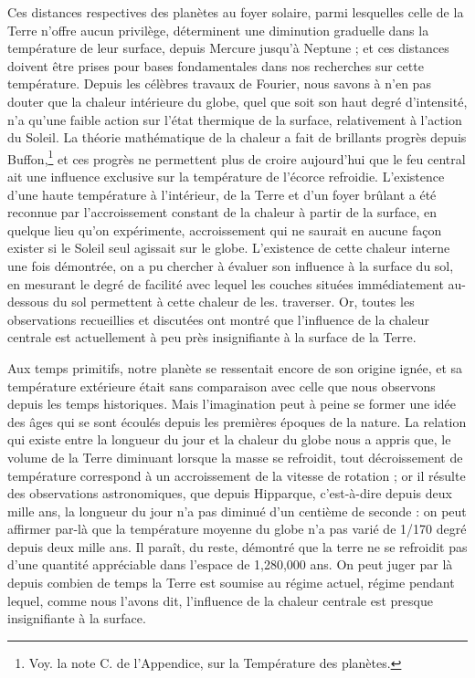 \documentclass[a4paper, 11pt, oneside]{article}
\begin{document}
Ces distances respectives des planètes au foyer solaire, parmi lesquelles celle de la Terre n'offre aucun privilège, déterminent une diminution graduelle dans la température de leur surface, depuis Mercure jusqu'à Neptune ; et ces distances doivent être prises pour bases fondamentales dans nos recherches sur cette température. Depuis les célèbres travaux de Fourier, nous savons à n'en pas douter que la chaleur intérieure du globe, quel que soit son haut degré d'intensité, n'a qu'une faible action sur l'état thermique de la surface, relativement à l'action du Soleil. La théorie mathématique de la chaleur a fait de brillants progrès depuis Buffon,\footnote{Voy. la note C. de l'Appendice, sur la Température des planètes.} et ces progrès ne permettent plus de croire aujourd'hui que le feu central ait une influence exclusive sur la température de l'écorce refroidie. L'existence d'une haute température à l'intérieur, de la Terre et d'un foyer brûlant a été reconnue par l'accroissement constant de la chaleur à partir de la surface, en quelque lieu qu'on expérimente, accroissement qui ne saurait en aucune façon exister si le Soleil seul agissait sur le globe. L'existence de cette chaleur interne une fois démontrée, on a pu chercher à évaluer son influence à la surface du sol, en mesurant le degré de facilité avec lequel les couches situées immédiatement au-dessous du sol permettent à cette chaleur de les. traverser. Or, toutes les observations recueillies et discutées ont montré que l'influence de la chaleur centrale est actuellement à peu près insignifiante à la surface de la Terre.

Aux temps primitifs, notre planète se ressentait encore de son origine ignée, et sa température extérieure était sans comparaison avec celle que nous observons depuis les temps historiques. Mais l'imagination peut à peine se former une idée des âges qui se sont écoulés depuis les premières époques de la nature. La relation qui existe entre la longueur du jour et la chaleur du globe nous a appris que, le volume de la Terre diminuant lorsque la masse se refroidit, tout décroissement de température correspond à un accroissement de la vitesse de rotation ; or il résulte des observations astronomiques, que depuis Hipparque, c'est-à-dire depuis deux mille ans, la longueur du jour n'a pas diminué d'un centième de seconde :
on peut affirmer par-là que la température moyenne du globe n'a pas varié de 1/170 degré depuis deux mille ans. Il paraît, du reste, démontré que la terre ne se refroidit pas d'une quantité appréciable dans l'espace de 1,280,000 ans. On peut juger par là depuis combien de temps la Terre est soumise au régime actuel, régime pendant lequel, comme nous l'avons dit, l'influence de la chaleur centrale est presque insignifiante à la surface.
\end{document}
